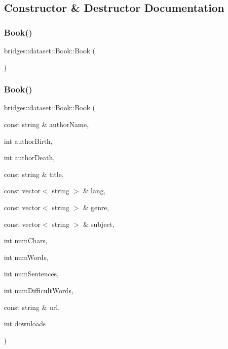 \subsection{Constructor \& Destructor Documentation}
\mbox{\label{classbridges_1_1dataset_1_1_book_a951e7d455f2fd89aa05224cbf362e244}} 
\subsubsection{\texorpdfstring{Book()}{Book()}\hspace{0.1cm}{\footnotesize\ttfamily [1/2]}}
{\footnotesize\ttfamily bridges\+::dataset\+::\+Book\+::\+Book (\begin{DoxyParamCaption}{ }\end{DoxyParamCaption})\hspace{0.3cm}{\ttfamily [inline]}}

\mbox{\label{classbridges_1_1dataset_1_1_book_a4770a401c2634cb9124c34e462721338}} 
\subsubsection{\texorpdfstring{Book()}{Book()}\hspace{0.1cm}{\footnotesize\ttfamily [2/2]}}
{\footnotesize\ttfamily bridges\+::dataset\+::\+Book\+::\+Book (\begin{DoxyParamCaption}\item[{const string \&}]{author\+Name,  }\item[{int}]{author\+Birth,  }\item[{int}]{author\+Death,  }\item[{const string \&}]{title,  }\item[{const vector$<$ string $>$ \&}]{lang,  }\item[{const vector$<$ string $>$ \&}]{genre,  }\item[{const vector$<$ string $>$ \&}]{subject,  }\item[{int}]{num\+Chars,  }\item[{int}]{num\+Words,  }\item[{int}]{num\+Sentences,  }\item[{int}]{num\+Difficult\+Words,  }\item[{const string \&}]{url,  }\item[{int}]{downloads }\end{DoxyParamCaption})\hspace{0.3cm}{\ttfamily [inline]}}



